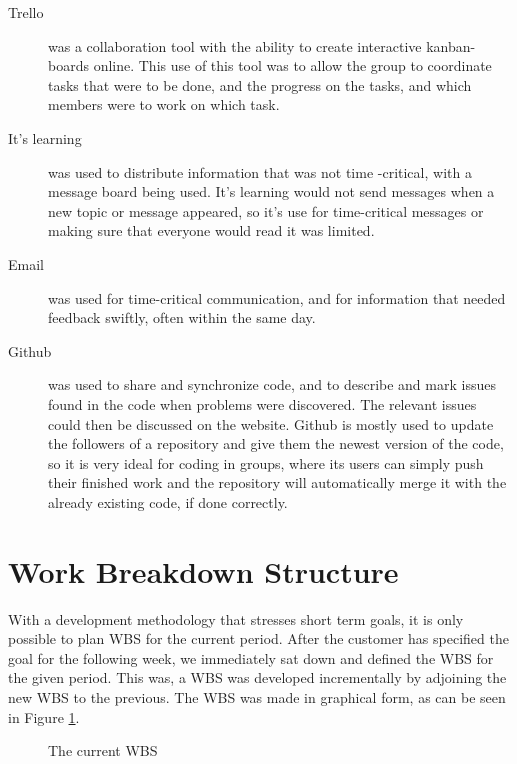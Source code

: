 \begin{description}

\item[Trello]  \label{def:trello} was a collaboration tool with the ability to create interactive kanban-boards online. This use of this tool was to allow the group to coordinate tasks that were to be done, and the progress on the tasks, and which members were to work on which task. 

\item[It's learning] was used to distribute information that was not time -critical, with a message board being used. It's learning would not send messages when a new topic or message appeared, so it's use for time-critical messages or making sure that everyone would read it was limited. 

\item[Email] was used for time-critical communication, and for information that needed feedback swiftly, often within the same day.

\item[Github] \label{def:github} was used to share and synchronize code, and to describe and mark issues found in the code when problems were discovered. The relevant issues could then be discussed on the website.
Github is mostly used to update the followers of a repository and give them the newest version of the code, so it is  very ideal for coding in groups, where its users can simply push their finished work and the repository will automatically merge it with the already existing code, if done correctly. 
\end{description}

\section{Work Breakdown Structure}
With a development methodology that stresses short term goals, it is only possible to plan WBS for the current period. After the customer has specified the goal for the following week, we immediately sat down and defined the WBS for the given period. This was, a WBS was developed incrementally by adjoining the new WBS to the previous. The WBS was made in graphical form, as can be seen in Figure \ref{fig:WBS}.

\begin{figure}[p]

\setlength\fboxsep{0pt}
\setlength\fboxrule{1pt}\noindent{}

\caption{The current WBS}
\label{fig:WBS}
\end{figure}

